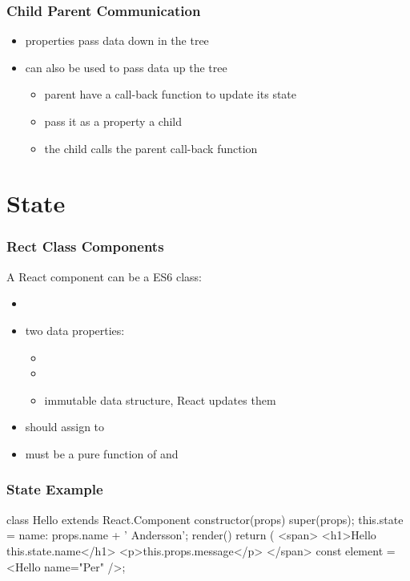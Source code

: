 \begin{frame}[fragile] \frametitle{Child Parent Communication}
\begin{itemize}
  \item properties pass data down in the tree
  \item can also be used to pass data up the tree
  \begin{itemize}
    \item parent have a call-back function to update its state
    \item pass it as a property a child
    \item the child calls the parent call-back function
  \end{itemize}
\end{itemize}
\end{frame}


\section{State}
\begin{frame}[fragile] \frametitle{Rect Class Components}
A React component can be a ES6 class:
  \begin{itemize}
    \item {}
    \item two data properties:
    \begin{itemize}
      \item {}
      \item {}
      \item immutable data structure, React updates them
    \end{itemize}
    \item {} should assign to 
    \item {} must be a pure function of  and 
  \end{itemize}
\end{frame}

\begin{frame}[fragile] \frametitle{State Example}
\begin{CodeBox}{}
class Hello extends React.Component {
  constructor(props) {
    super(props);
    this.state = {name: props.name + ' Andersson'};
  }
  render() {
    return (
      <span>
        <h1>Hello {this.state.name}</h1>
        <p>{this.props.message}</p>
      </span>
  }
}
const element = <Hello name="Per" />;
\end{CodeBox}
\end{frame}

